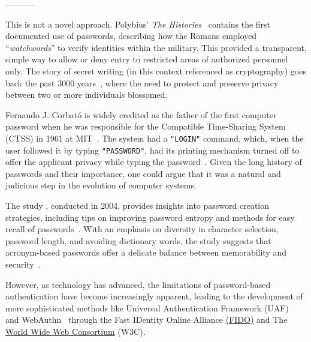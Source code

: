 -----------

This is not a novel approach.
Polybius' \textit{The Histories}~\cite{perseus_tufts} contains the first
documented use of passwords, describing how the Romans employed
``\textit{watchwords}'' to verify identities within the military.
This provided a transparent, simple way to allow or deny entry to restricted
areas of authorized personnel only.
The story of secret writing (in this context referenced as cryptography) goes
back the past 3000 years~\cite{history_cryptography_cryptanalysis}, where the
need to protect and preserve privacy between two or more individuals blossomed.

Fernando J. Corbató is widely credited as the father of the first
computer password when he was responsible for the Compatible Time-Sharing
System (CTSS) in 1961 at MIT~\cite{levy1984hackers}.
The system had a \texttt{"LOGIN"} command, which, when the user followed it by
typing \texttt{"PASSWORD"}, had its printing mechanism turned off to offer
the applicant privacy while typing the password~\cite{ctss_programmers_guide}.
Given the long history of passwords and their importance, one could argue that
it was a natural and judicious step in the evolution of computer systems.

The study , conducted in
2004, provides insights into password creation strategies, including tips on
improving password entropy and methods for easy recall of passwords~\cite{
  yan2000password}.
With an emphasis on diversity in character selection, password length, and
avoiding dictionary words, the study suggests that acronym-based passwords offer
a delicate balance between memorability and security~\cite{yan2000password}.

However, as technology has advanced, the limitations of password-based
authentication have become increasingly apparent, leading to the development of
more sophisticated methods like Universal Authentication Framework
(UAF)~\cite{fido_uaf_overview} and WebAuthn~\cite{webauthn_level_2} through the
Fast IDentity Online Alliance \href{https://fidoalliance.org}{(FIDO)} and
The \href{https://www.w3.org}{World Wide Web Consortium} (W3C).
